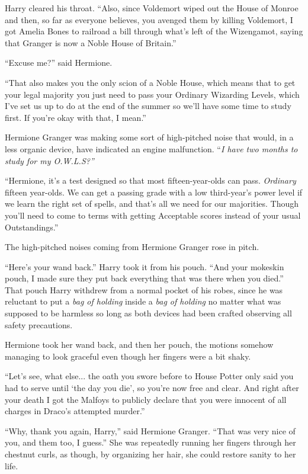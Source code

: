 Harry cleared his throat. ``Also, since Voldemort wiped out the House of Monroe and then, so far as everyone believes, you avenged them by killing Voldemort, I got Amelia Bones to railroad a bill through what's left of the Wizengamot, saying that Granger is now a Noble House of Britain.''

``Excuse me?'' said Hermione.

``That also makes you the only scion of a Noble House, which means that to get your legal majority you just need to pass your Ordinary Wizarding Levels, which I've set us up to do at the end of the summer so we'll have some time to study first. If you're okay with that, I mean.''

Hermione Granger was making some sort of high-pitched noise that would, in a less organic device, have indicated an engine malfunction. ``\emph{I have two months to study for my O.W.L.S?''}

``Hermione, it's a test designed so that most fifteen-year-olds can pass. \emph{Ordinary} fifteen year-olds. We can get a passing grade with a low third-year's power level if we learn the right set of spells, and that's all we need for our majorities. Though you'll need to come to terms with getting Acceptable scores instead of your usual Outstandings.''

The high-pitched noises coming from Hermione Granger rose in pitch.

``Here's your wand back.'' Harry took it from his pouch. ``And your mokeskin pouch, I made sure they put back everything that was there when you died.'' That pouch Harry withdrew from a normal pocket of his robes, since he was reluctant to put a \emph{bag of holding} inside a \emph{bag of holding} no matter what was supposed to be harmless so long as both devices had been crafted observing all safety precautions.

Hermione took her wand back, and then her pouch, the motions somehow managing to look graceful even though her fingers were a bit shaky.

``Let's see, what else... the oath you swore before to House Potter only said you had to serve until `the day you die', so you're now free and clear. And right after your death I got the Malfoys to publicly declare that you were innocent of all charges in Draco's attempted murder.''

``Why, thank you again, Harry,'' said Hermione Granger. ``That was very nice of you, and them too, I guess.'' She was repeatedly running her fingers through her chestnut curls, as though, by organizing her hair, she could restore sanity to her life.

